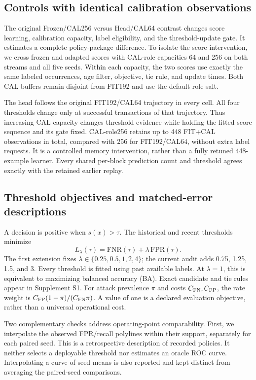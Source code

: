 \subsection{Controls with identical calibration observations}
The original Frozen/CAL256 versus Head/CAL64 contrast changes score learning, calibration capacity, label eligibility, and the threshold-update gate. It estimates a complete policy-package difference. To isolate the score intervention, we cross frozen and adapted scores with CAL-role capacities 64 and 256 on both streams and all five seeds. Within each capacity, the two scores use exactly the same labeled occurrences, age filter, objective, tie rule, and update times. Both CAL buffers remain disjoint from FIT192 and use the default role salt.

The head follows the original FIT192/CAL64 trajectory in every cell. All four thresholds change only at successful transactions of that trajectory. Thus increasing CAL capacity changes threshold evidence while holding the fitted score sequence and its gate fixed. CAL-role256 retains up to 448 FIT+CAL observations in total, compared with 256 for FIT192/CAL64, without extra label requests. It is a controlled memory intervention, rather than a fully retuned 448-example learner. Every shared per-block prediction count and threshold agrees exactly with the retained earlier replay.

\subsection{Threshold objectives and matched-error descriptions}
A decision is positive when $s(x)>\tau$. The historical and recent thresholds minimize
\begin{equation}
 L_\lambda(\tau)=\mathrm{FNR}(\tau)+\lambda\,\mathrm{FPR}(\tau).
 \label{eq:cost}
\end{equation}
The first extension fixes $\lambda\in\{0.25,0.5,1,2,4\}$; the current audit adds 0.75, 1.25, 1.5, and 3. Every threshold is fitted using past available labels. At $\lambda=1$, this is equivalent to maximizing balanced accuracy (BA). Exact candidate and tie rules appear in Supplement S1. For attack prevalence $\pi$ and costs $C_{\rm FN},C_{\rm FP}$, the rate weight is $C_{\rm FP}(1-\pi)/(C_{\rm FN}\pi)$. A value of one is a declared evaluation objective, rather than a universal operational cost.

Two complementary checks address operating-point comparability. First, we interpolate the observed FPR/recall polylines within their support, separately for each paired seed. This is a retrospective description of recorded policies. It neither selects a deployable threshold nor estimates an oracle ROC curve. Interpolating a curve of seed means is also reported and kept distinct from averaging the paired-seed comparisons.

